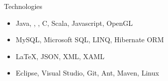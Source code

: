 \cvitem
    {Technologies}
    {\begin{itemize}
        \item Java, \csharp, \cpp, C, Scala, Javascript, OpenGL
        \item MySQL, Microsoft SQL, LINQ, Hibernate ORM
        \item \LaTeX, JSON, XML, XAML
        \item Eclipse, Visual Studio, Git, Ant, Maven, Linux
    \end{itemize}}
    \vspace*{-\baselineskip}